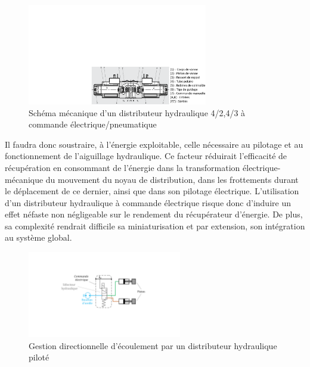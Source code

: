 \begin{figure}
	\begin{center}
		\captionsetup{justification=centering}
		\includegraphics[trim={12.1cm 0cm 0cm 11.9cm},clip,width=0.7\textwidth]{../Chap2/Figure/distributeur_hyd8_Hydrac.pdf}
		\caption{Schéma mécanique d'un distributeur hydraulique 4/2,4/3 à commande électrique/pneumatique \cite{HYDRACINTERNATIONAL2022}}
		\label{fig:distributeur_hyd_HYDRAC}
	\end{center}
\end{figure}		
Il faudra donc soustraire, à l'énergie exploitable, celle nécessaire au pilotage et au fonctionnement de l'aiguillage hydraulique. Ce facteur réduirait l'efficacité de récupération en consommant de l'énergie dans la transformation électrique-mécanique du mouvement du noyau de distribution, dans les frottements durant le déplacement de ce dernier, ainsi que dans son pilotage électrique. L'utilisation d'un distributeur hydraulique à commande électrique risque donc d'induire un effet néfaste non négligeable sur le rendement du récupérateur d'énergie. De plus, sa complexité rendrait difficile sa miniaturisation et par extension, son intégration au système global.

\begin{figure}[!htbp]
	\begin{center}
		\captionsetup{justification=centering}
		\includegraphics[trim={7cm 6cm 7.5cm 4.9cm},clip,width=0.6\textwidth]{../Chap2/Figure/distributeur_hyd.pdf}
		\caption{Gestion directionnelle d'écoulement par un distributeur hydraulique piloté}
		\label{fig:distributeur_hyd}
	\end{center}
\end{figure}	

